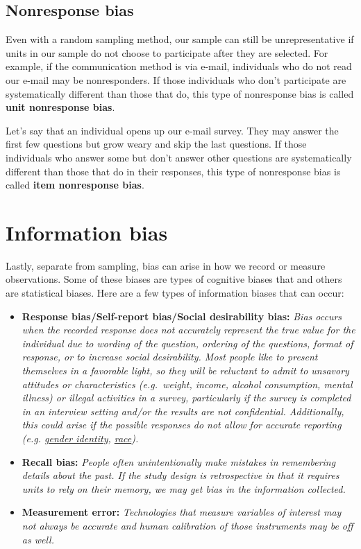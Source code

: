 \documentclass[]{book}
\providecommand{\tightlist}{%
  \setlength{\itemsep}{0pt}\setlength{\parskip}{0pt}}
\begin{document}
\hypertarget{nonresponse-bias}{%
\subsection{Nonresponse bias}\label{nonresponse-bias}}

Even with a random sampling method, our sample can still be unrepresentative if units in our sample do not choose to participate after they are selected. For example, if the communication method is via e-mail, individuals who do not read our e-mail may be nonresponders. If those individuals who don't participate are systematically different than those that do, this type of nonresponse bias is called \textbf{unit nonresponse bias}.

Let's say that an individual opens up our e-mail survey. They may answer the first few questions but grow weary and skip the last questions. If those individuals who answer some but don't answer other questions are systematically different than those that do in their responses, this type of nonresponse bias is called \textbf{item nonresponse bias}.

\hypertarget{information-bias}{%
\section{Information bias}\label{information-bias}}

Lastly, separate from sampling, bias can arise in how we record or measure observations. Some of these biases are types of cognitive biases that and others are statistical biases. Here are a few types of information biases that can occur:

\begin{itemize}
\tightlist
\item
  \textbf{Response bias/Self-report bias/Social desirability bias:} \emph{Bias occurs when the recorded response does not accurately represent the true value for the individual due to wording of the question, ordering of the questions, format of response, or to increase social desirability. Most people like to present themselves in a favorable light, so they will be reluctant to admit to unsavory attitudes or characteristics (e.g.~weight, income, alcohol consumption, mental illness) or illegal activities in a survey, particularly if the survey is completed in an interview setting and/or the results are not confidential. Additionally, this could arise if the possible responses do not allow for accurate reporting (e.g. \href{https://www.hrc.org/resources/collecting-transgender-inclusive-gender-data-in-workplace-and-other-surveys}{gender identity}, \href{https://www.pewsocialtrends.org/interactives/multiracial-timeline/}{race}).}
\item
  \textbf{Recall bias:} \emph{People often unintentionally make mistakes in remembering details about the past. If the study design is retrospective in that it requires units to rely on their memory, we may get bias in the information collected.}
\item
  \textbf{Measurement error:} \emph{Technologies that measure variables of interest may not always be accurate and human calibration of those instruments may be off as well.}
\end{itemize}
\end{document}
